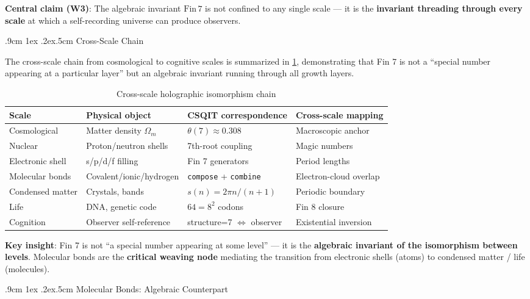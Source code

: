 \documentclass[aps,prd,twocolumn,nofootinbib,floatfix]{revtex4-2}
\makeatletter
\def\subsection{%
  \@startsection{subsection}{2}{\z@}
    {.9cm \@plus1ex \@minus .2ex}{.5cm}
    {\normalfont\normalsize\bfseries\centering}%
}
\makeatother
\begin{document}
\textbf{Central claim (W3)}: The algebraic invariant $\mathrm{Fin}\,7$ is not confined to any single scale --- it is the \textbf{invariant threading through every scale} at which a self-recording universe can produce observers.

\subsection{Cross-Scale Chain}

The cross-scale chain from cosmological to cognitive scales is summarized in \cref{tab:cross_scale}, demonstrating that Fin 7 is not a ``special number appearing at a particular layer'' but an algebraic invariant running through all growth layers.

\begin{table}[!t]
\centering
\begin{tabular}{|l|l|l|l|}
\hline
Scale & Physical object & CSQIT correspondence & Cross-scale mapping \\
\hline
Cosmological & Matter density $\Omega_m$ & $\theta(7) \approx 0.308$ & Macroscopic anchor \\
Nuclear & Proton/neutron shells & 7th-root coupling & Magic numbers \\
Electronic shell & s/p/d/f filling & Fin 7 generators & Period lengths \\
Molecular bonds & Covalent/ionic/hydrogen & \texttt{compose} + \texttt{combine} & Electron-cloud overlap \\
Condensed matter & Crystals, bands & $s(n)=2\pi n/(n+1)$ & Periodic boundary \\
Life & DNA, genetic code & $64 = 8^2$ codons & Fin 8 closure \\
Cognition & Observer self-reference & structure=7 $\iff$ observer & Existential inversion \\
\hline
\end{tabular}
\caption{Cross-scale holographic isomorphism chain}
\label{tab:cross_scale}
\end{table}

\textbf{Key insight}: Fin 7 is not ``a special number appearing at some level'' --- it is the \textbf{algebraic invariant of the isomorphism between levels}. Molecular bonds are the \textbf{critical weaving node} mediating the transition from electronic shells (atoms) to condensed matter / life (molecules).

\subsection{Molecular Bonds: Algebraic Counterpart}
\end{document}

